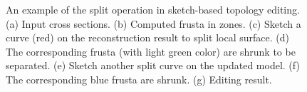 \begin{figure} [htbp]
{\begin{minipage}[b]{0.22\textwidth}
    \end{minipage}}
  \caption{An example of the split operation in sketch-based topology editing.
  (a) Input cross sections.
  (b) Computed frusta in zones.
  (c) Sketch a curve (red) on the reconstruction result to split local surface.
  (d) The corresponding frusta (with light green color) are shrunk to be separated.
  (e) Sketch another split curve on the updated model.
  (f) The corresponding blue frusta are shrunk.
  (g) Editing result.}
  \label{fig:be}
\end{figure}

